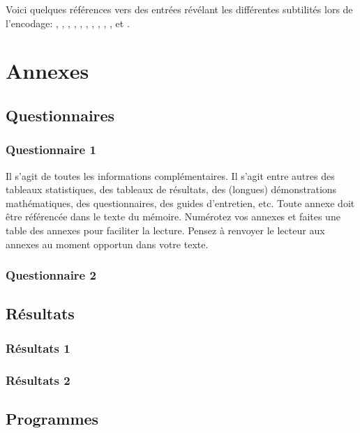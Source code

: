 \documentclass[a4paper,11pt]{book}
\begin{document}
Voici quelques références vers des entrées révélant les différentes subtilités lors de l'encodage: \cite{talon1972monologue},
\cite{toulemonde1968voisinage},
\cite{talon1975cuisine},
\cite{vanbroeck1980rhetorique},
\cite{crouton1983these},
\cite{talon1965memoire},
\cite{ministere1971rapport},
\cite{lefuneste1978solitude},
\cite{anon1969voisin},
\cite{talon2001blog},
\cite{talon1990oeuvrescompletes} et 
\cite{morose1985silence}.



\part*{Annexes}
 
 \chapter{Questionnaires}

 
 \section{Questionnaire 1}

 Il s'agit de toutes les informations complémentaires. Il s'agit entre
 autres des tableaux statistiques, des tableaux de résultats, des
 (longues) démonstrations mathématiques, des questionnaires, des
 guides d'entretien, etc. Toute annexe doit être référencée dans le
 texte du mémoire. Numérotez vos annexes et faites une table des
 annexes pour faciliter la lecture. Pensez à renvoyer le lecteur aux
 annexes au moment opportun dans votre texte.

 \section{Questionnaire 2}

 \chapter{Résultats}

\section{Résultats 1}
\section{Résultats 2}

\chapter{Programmes}
\end{document}
